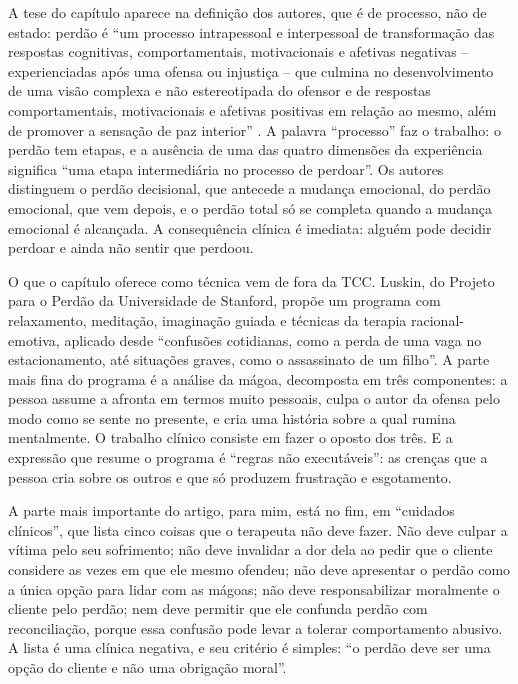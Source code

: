 \documentclass[12pt]{article}
\begin{document}
A tese do capítulo aparece na definição dos autores, que é de processo, não de estado: perdão é ``um processo intrapessoal e interpessoal de transformação das respostas cognitivas, comportamentais, motivacionais e afetivas negativas -- experienciadas após uma ofensa ou injustiça -- que culmina no desenvolvimento de uma visão complexa e não estereotipada do ofensor e de respostas comportamentais, motivacionais e afetivas positivas em relação ao mesmo, além de promover a sensação de paz interior'' \cite{pinho}. A palavra ``processo'' faz o trabalho: o perdão tem etapas, e a ausência de uma das quatro dimensões da experiência significa ``uma etapa intermediária no processo de perdoar''. Os autores distinguem o perdão decisional, que antecede a mudança emocional, do perdão emocional, que vem depois, e o perdão total só se completa quando a mudança emocional é alcançada. A consequência clínica é imediata: alguém pode decidir perdoar e ainda não sentir que perdoou.

O que o capítulo oferece como técnica vem de fora da TCC. Luskin, do Projeto para o Perdão da Universidade de Stanford, propõe um programa com relaxamento, meditação, imaginação guiada e técnicas da terapia racional-emotiva, aplicado desde ``confusões cotidianas, como a perda de uma vaga no estacionamento, até situações graves, como o assassinato de um filho''. A parte mais fina do programa é a análise da mágoa, decomposta em três componentes: a pessoa assume a afronta em termos muito pessoais, culpa o autor da ofensa pelo modo como se sente no presente, e cria uma história sobre a qual rumina mentalmente. O trabalho clínico consiste em fazer o oposto dos três. E a expressão que resume o programa é ``regras não executáveis'': as crenças que a pessoa cria sobre os outros e que só produzem frustração e esgotamento.

A parte mais importante do artigo, para mim, está no fim, em ``cuidados clínicos'', que lista cinco coisas que o terapeuta não deve fazer. Não deve culpar a vítima pelo seu sofrimento; não deve invalidar a dor dela ao pedir que o cliente considere as vezes em que ele mesmo ofendeu; não deve apresentar o perdão como a única opção para lidar com as mágoas; não deve responsabilizar moralmente o cliente pelo perdão; nem deve permitir que ele confunda perdão com reconciliação, porque essa confusão pode levar a tolerar comportamento abusivo. A lista é uma clínica negativa, e seu critério é simples: ``o perdão deve ser uma opção do cliente e não uma obrigação moral''.
\end{document}
